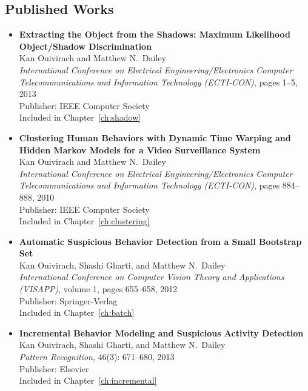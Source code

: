\subsection*{Published Works}

\begin{itemize}
  \renewcommand\labelitemi{--} 
  
  \item {\bf{Extracting the Object from the Shadows: Maximum
    Likelihood Object/Shadow Discrimination}}\\ Kan Ouivirach and
    Matthew N.\ Dailey\\ \textit{International Conference on
    Electrical Engineering/Electronics Computer Telecommunications and
    Information Technology (ECTI-CON)}, pages 1--5, 2013\\ 
    Publisher: IEEE Computer Society\\ Included in 
    Chapter~\ref{ch:shadow}

  \item \textbf{Clustering Human Behaviors with Dynamic Time Warping
    and Hidden Markov Models for a Video Surveillance
    System}\nocite{kan10clustering}\\ Kan Ouivirach and Matthew N.\
    Dailey\\ \textit{International Conference on Electrical
    Engineering/Electronics Computer Telecommunications and
    Information Technology (ECTI-CON)}, pages 884--888, 2010\\
    Publisher: IEEE Computer Society\\ Included in
    Chapter~\ref{ch:clustering}\\

  \item \textbf{Automatic Suspicious Behavior Detection from a Small
    Bootstrap Set}\nocite{kan12detection}\\ Kan Ouivirach, Shashi
    Gharti, and Matthew N.\ Dailey\\ \textit{International Conference
    on Computer Vision Theory and Applications (VISAPP)}, volume 1,
    pages 655--658, 2012\\ Publisher: Springer-Verlag\\ Included in
    Chapter~\ref{ch:batch}\\

  \item \textbf{Incremental Behavior Modeling and Suspicious Activity
    Detection}\nocite{kan13incremental}\\ Kan Ouivirach, Shashi
    Gharti, and Matthew N.\ Dailey\\ \textit{Pattern Recognition},
    46(3): 671--680, 2013\\ Publisher: Elsevier\\ Included in
    Chapter~\ref{ch:incremental}
  
\end{itemize}

